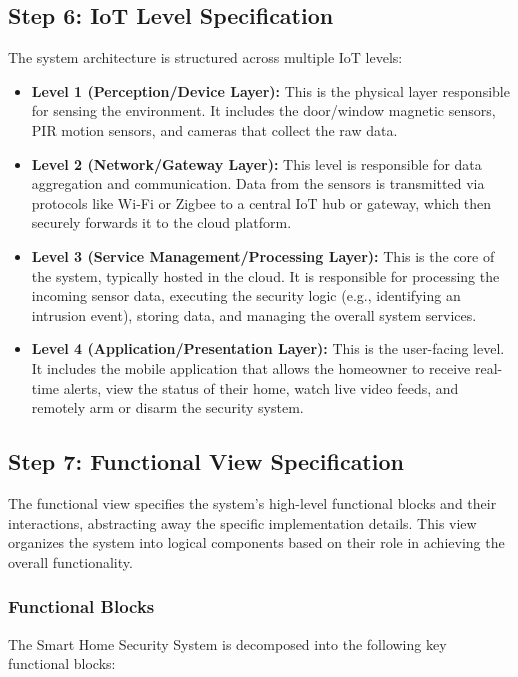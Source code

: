 \documentclass[conference]{IEEEtran}
\begin{document}
\subsection{Step 6: IoT Level Specification}
The system architecture is structured across multiple IoT levels:
\begin{itemize}
    \item \textbf{Level 1 (Perception/Device Layer):} This is the physical layer responsible for sensing the environment. It includes the door/window magnetic sensors, PIR motion sensors, and cameras that collect the raw data.

    \item \textbf{Level 2 (Network/Gateway Layer):} This level is responsible for data aggregation and communication. Data from the sensors is transmitted via protocols like Wi-Fi or Zigbee to a central IoT hub or gateway, which then securely forwards it to the cloud platform.

    \item \textbf{Level 3 (Service Management/Processing Layer):} This is the core of the system, typically hosted in the cloud. It is responsible for processing the incoming sensor data, executing the security logic (e.g., identifying an intrusion event), storing data, and managing the overall system services.

    \item \textbf{Level 4 (Application/Presentation Layer):} This is the user-facing level. It includes the mobile application that allows the homeowner to receive real-time alerts, view the status of their home, watch live video feeds, and remotely arm or disarm the security system.
\end{itemize}

\subsection{Step 7: Functional View Specification}
The functional view specifies the system's high-level functional blocks and their interactions, abstracting away the specific implementation details. This view organizes the system into logical components based on their role in achieving the overall functionality.

\subsubsection{Functional Blocks}
The Smart Home Security System is decomposed into the following key functional blocks:
\end{document}
